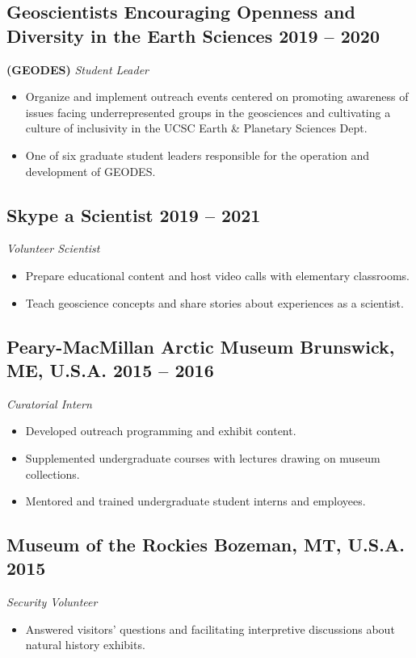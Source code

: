 \documentclass[10pt]{article}
\begin{document}
\subsection*{\textbf{Geoscientists Encouraging Openness and Diversity in the Earth Sciences} \hfill 2019 – 2020}
\textbf{(GEODES)} \hspace{3pt} \textit{Student Leader}
\begin{itemize}
	\item Organize and implement outreach events centered on promoting awareness of issues facing underrepresented groups in the geosciences and cultivating a culture of inclusivity in the UCSC Earth \& Planetary Sciences Dept.
	\item One of six graduate student leaders responsible for the operation and development of GEODES.
\end{itemize}

\subsection*{\textbf{Skype a Scientist} \hfill 2019 – 2021}
\textit{Volunteer Scientist}
\begin{itemize}
	\item Prepare educational content and host video calls with elementary classrooms.
	\item Teach geoscience concepts and share stories about experiences as a scientist.
\end{itemize}

\subsection*{\textbf{Peary-MacMillan Arctic Museum} \hspace{15pt} Brunswick, ME, U.S.A. \hfill 2015 – 2016}
\textit{Curatorial Intern}
\begin{itemize}
	\item Developed outreach programming and exhibit content.
	\item Supplemented undergraduate courses with lectures drawing on museum collections.
	\item Mentored and trained undergraduate student interns and employees.
\end{itemize}

\subsection*{\textbf{Museum of the Rockies} \hspace{15pt} Bozeman, MT, U.S.A. \hfill 2015}
\textit{Security Volunteer}
\begin{itemize}
	\item Answered visitors' questions and facilitating interpretive discussions about natural history exhibits.
\end{itemize}
\end{document}
